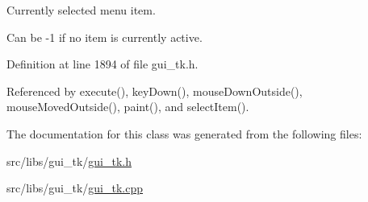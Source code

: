 Currently selected menu item. 

Can be -\/1 if no item is currently active. 

Definition at line 1894 of file gui\-\_\-tk.\-h.



Referenced by execute(), key\-Down(), mouse\-Down\-Outside(), mouse\-Moved\-Outside(), paint(), and select\-Item().



The documentation for this class was generated from the following files\-:\begin{DoxyCompactItemize}
\item 
src/libs/gui\-\_\-tk/\hyperlink{gui__tk_8h}{gui\-\_\-tk.\-h}\item 
src/libs/gui\-\_\-tk/\hyperlink{gui__tk_8cpp}{gui\-\_\-tk.\-cpp}\end{DoxyCompactItemize}
